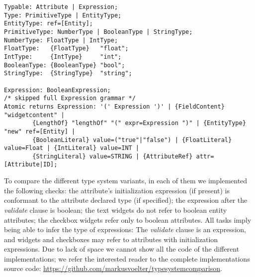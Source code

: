 \begin{lstlisting}[language=xtext,float,label=lst:grammar-plain-types-and-ex,caption=Types
and Expressions.] 
Typable: Attribute | Expression;
Type: PrimitiveType | EntityType;
EntityType: ref=[Entity];
PrimitiveType: NumberType | BooleanType | StringType;
NumberType: FloatType | IntType;
FloatType:   {FloatType}   "float";
IntType:     {IntType}     "int";
BooleanType: {BooleanType} "bool";
StringType:	 {StringType}  "string";

Expression: BooleanExpression;
/* skipped full Expression grammar */
Atomic returns Expression: '(' Expression ')' | {FieldContent} "widgetcontent" |
		{LengthOf} "lengthOf" "(" expr=Expression ")" | {EntityType} "new" ref=[Entity] | 
		{BooleanLiteral} value=("true"|"false") | {FloatLiteral} value=Float | {IntLiteral} value=INT |
		{StringLiteral} value=STRING | {AttributeRef} attr=[Attribute|ID];
\end{lstlisting}

%




To compare the different type system variants, in each of them we implemented
the following checks: the attribute's initialization expression (if present)
is conformant to the attribute declared type (if specified); the expression
after the \emph{validate} clause is boolean; the text widgets do not refer to
boolean entity attributes; the checkbox widgets refer only to boolean
attributes.
All tasks imply being able to infer the type of expressions: The \emph{validate}
clause is an expression, and widgets and checkboxes may refer to attributes with
initialization expressions.  Due to lack of space we cannot show all the code of
the different implementations; we refer the interested reader to the complete
implementations source code:
\url{https://github.com/markusvoelter/typesystemcomparison}.
